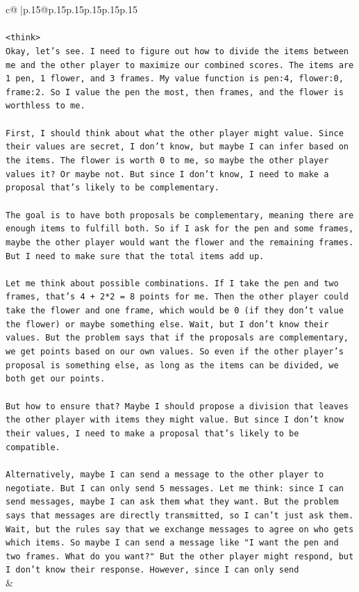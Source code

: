\documentclass{article}
\begin{document}
{\begin{supertabular}{c@{$\;$}|p{.15\linewidth}@{}p{.15\linewidth}p{.15\linewidth}p{.15\linewidth}p{.15\linewidth}p{.15\linewidth}}
{{{\\ 
\\ 
\texttt{<think>} \\
\texttt{Okay, let's see. I need to figure out how to divide the items between me and the other player to maximize our combined scores. The items are 1 pen, 1 flower, and 3 frames. My value function is pen:4, flower:0, frame:2. So I value the pen the most, then frames, and the flower is worthless to me.} \\
\\ 
\texttt{First, I should think about what the other player might value. Since their values are secret, I don't know, but maybe I can infer based on the items. The flower is worth 0 to me, so maybe the other player values it? Or maybe not. But since I don't know, I need to make a proposal that's likely to be complementary.} \\
\\ 
\texttt{The goal is to have both proposals be complementary, meaning there are enough items to fulfill both. So if I ask for the pen and some frames, maybe the other player would want the flower and the remaining frames. But I need to make sure that the total items add up.} \\
\\ 
\texttt{Let me think about possible combinations. If I take the pen and two frames, that's 4 + 2*2 = 8 points for me. Then the other player could take the flower and one frame, which would be 0 (if they don't value the flower) or maybe something else. Wait, but I don't know their values. But the problem says that if the proposals are complementary, we get points based on our own values. So even if the other player's proposal is something else, as long as the items can be divided, we both get our points.} \\
\\ 
\texttt{But how to ensure that? Maybe I should propose a division that leaves the other player with items they might value. But since I don't know their values, I need to make a proposal that's likely to be compatible.} \\
\\ 
\texttt{Alternatively, maybe I can send a message to the other player to negotiate. But I can only send 5 messages. Let me think: since I can send messages, maybe I can ask them what they want. But the problem says that messages are directly transmitted, so I can't just ask them. Wait, but the rules say that we exchange messages to agree on who gets which items. So maybe I can send a message like "I want the pen and two frames. What do you want?" But the other player might respond, but I don't know their response. However, since I can only send} \\
            }
        }
    }
    & \\ \\


\end{supertabular}}
\end{document}
